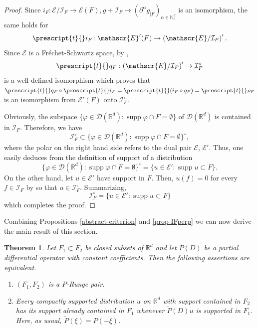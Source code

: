 \documentclass[10pt,leqno]{amsart}
\newtheorem{theorem}[prop]{Theorem}
\theoremstyle{definition}
\newcommand{\R}{\mathbb R}
\newcommand{\N}{\mathbb N}
\newcommand{\cI}{\mathcal I}
\newcommand{\supp}{\operatorname{supp}}
\let\rho\varrho
\begin{document}
\begin{proof}
	Since $i_F\colon\mathscr{E} /\cI_F\to\mathscr{E}(F), g+\cI_F\mapsto (\partial^\alpha g_{\mid F})_{\alpha\in\N_0^d}$ is an isomorphism, the same holds for
	$$\prescript{t}{}i_F\colon\mathscr{E}'(F)\to\left(\mathscr{E} /\cI_F\right)'.$$
	Since $\mathscr{E} $ is a Fr\'echet-Schwartz space, by \cite[Corollary 26.25 and Remark 26.5]{MeV},
	$$\prescript{t}{}q_F:\left(\mathscr{E} /\cI_F\right)'\to\cI_F^\circ$$
	is a well-defined isomorphism which proves that $\prescript{t}{}q_F\circ\prescript{t}{}i_F=\prescript{t}{}(i_F\circ q_F)=\prescript{t}{}\rho_F$ is an isomorphism from $\mathscr{E}'(F)$ onto $\cI_F^\circ$.
	
	Obviously, the subspace $\{\varphi\in\mathscr{D}(\R^d)\colon \supp\varphi\cap F=\emptyset\}$ of $\mathscr{D}(\R^d)$ is contained in $\cI_F$. Therefore, we have
	$$\cI_F^\circ\subset \{\varphi\in\mathscr{D}(\R^d)\colon \supp\varphi\cap F=\emptyset\}^\circ,$$
	where the polar on the right hand side refers to the dual pair $\mathscr{E} $, $\mathscr{E}'$. Thus, one easily deduces from the definition of support of a distribution
	$$\{\varphi\in\mathscr{D}(\R^d)\colon \supp\varphi\cap F=\emptyset\}^\circ=\{u\in\mathscr{E}'\colon \supp u\subset F\}.$$
	On the other hand, let $u\in\mathscr{E}'$ have support in $F$. Then, $u(f)=0$ for every $f\in\cI_F$ by \cite[Theorem 2.3.3]{Hor1} so that $u\in\cI_F^\circ$. Summarizing,
	$$\cI_F^\circ=\{u\in\mathscr{E}'\colon \supp u\subset F\}$$
	which completes the proof.
\end{proof}

Combining Propositions \ref{abstract-criterion} and \ref{prop-IFperp} we can now derive the main result of this section.

\begin{theorem}\label{criterion-lax-malgrange}
	Let $F_1\subset F_2$ be closed subsets of $\R^d$ and let $P(D)$ be a partial differential operator with constant coefficients. Then the following assertions are equivalent.
	\begin{enumerate}[{\upshape(i)}]
		\item $(F_1, F_2)$ is a $P$-Runge pair.
		\item Every compactly supported distribution $u$ on $\R^d$ with support contained in $F_2$ has its support already contained in $F_1$ whenever $\check P(D)u$ is supported in $F_1$. Here, as usual, $\check{P}(\xi)=P(-\xi)$.
	\end{enumerate}
\end{theorem}
\end{document}
